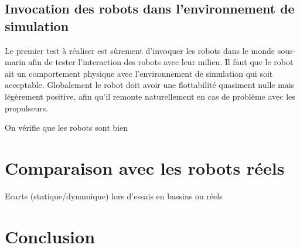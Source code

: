 		\subsection{Invocation des robots dans l'environnement de simulation}

			Le premier test à réaliser est sûrement d'invoquer les robots dans le monde sous-marin afin de tester l'interaction des robots avec leur milieu. Il faut que le robot ait un comportement physique avec l'environnement de simulation qui soit acceptable. Globalement le robot doit avoir une flottabilité quasiment nulle mais légèrement positive, afin qu'il remonte naturellement en cas de problème avec les propulseurs.

			On vérifie que les robots sont bien 

	\section{Comparaison avec les robots réels}

		Ecarts (statique/dynamique) lors d'essais en bassins ou réels

	\section{Conclusion}